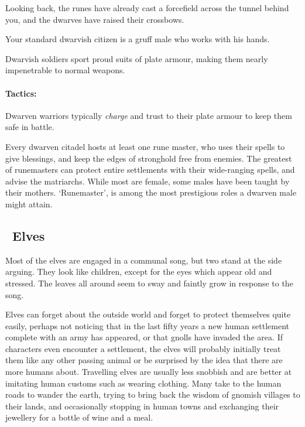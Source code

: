\begin{multicols}{2}
\begin{boxtext}
  Looking back, the runes have already cast a forcefield across the tunnel behind you, and the dwarves have raised their crossbows.

\end{boxtext}

\label{dwarven_trader}

Your standard dwarvish citizen is a gruff male who works with his hands.

\dwarventrader

\label{dwarven_soldier}

Dwarvish soldiers sport proud suits of plate armour, making them nearly impenetrable to normal weapons.


\paragraph{Tactics:} Dwarven  warriors typically \textit{charge} and trust to their plate armour to keep them safe in battle.%

\label{dwarven_runemaster}

Every dwarven citadel hosts at least one rune master, who uses their spells to give blessings, and keep the edges of stronghold free from enemies.
The greatest of runemasters can protect entire settlements with their wide-ranging spells, and advise the matriarchs.
While most are female, some males have been taught by their mothers.
`Runemaster', is among the most prestigious roles a dwarven male might attain.

\dwarvenrunemaster

\subsection[Elves]{\El\ Elves}
\label{best_elves}

\begin{boxtext}

  Most of the elves are engaged in a communal song, but two stand at the side arguing.
  They look like children, except for the eyes which appear old and stressed.
  The leaves all around seem to sway and faintly grow in response to the song.

\end{boxtext}

Elves can forget about the outside world and forget to protect themselves quite easily, perhaps not noticing that in the last fifty years a new human settlement complete with an army has appeared, or that gnolls have invaded the area.
If characters even encounter a settlement, the elves will probably initially treat them like any other passing animal or be surprised by the idea that there are more humans about.
Travelling elves are usually less snobbish and are better at imitating human customs such as wearing clothing.
Many take to the human roads to wander the earth, trying to bring back the wisdom of gnomish villages to their lands, and occasionally stopping in human towns and exchanging their jewellery for a bottle of wine and a meal.


\end{multicols}
